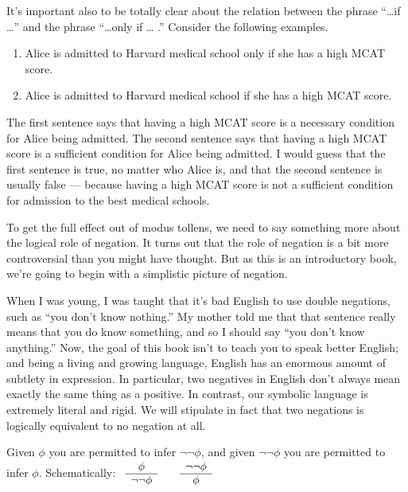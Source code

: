It's important also to be totally clear about the relation between the
phrase ``\dots if \dots'' and the phrase ``\dots only if \dots
.''  Consider the following examples.
\begin{enumerate}
  \item Alice is admitted to Harvard medical school only if she has a high
  MCAT score.
  \item Alice is admitted to Harvard medical school if she has a high
    MCAT score.
  \end{enumerate}
  The first sentence says that having a high MCAT score is a necessary
  condition for Alice being admitted.  The second sentence says that
  having a high MCAT score is a sufficient condition for Alice being
  admitted.  I would guess that the first sentence is true, no matter
  who Alice is, and that the second sentence is usually false ---
  because having a high MCAT score is not a sufficient condition for
  admission to the best medical schools.
 
To get the full effect out of modus tollens, we need to say something
more about the logical role of negation.  It turns out that the role
of negation is a bit more controversial than you might have thought.
But as this is an introductory book, we're going to begin with a
simplistic picture of negation.

When I was young, I was taught that it's bad English to use double
negations, such as ``you don't know nothing.''  My mother told me that
that sentence really means that you do know something, and so I should
say ``you don't know anything.''  Now, the goal of this book isn't to
teach you to speak better English; and being a living and growing
language, English has an enormous amount of subtlety in expression.
In particular, two negatives in English don't always mean exactly the
same thing as a positive.  In contrast, our symbolic language is
extremely literal and rigid.  We will stipulate in fact that two
negations is logically equivalent to no negation at all.

\bigskip 
\begin{tcolorbox}[enhanced,width=10cm,title=double negation (DN),attach boxed title to top
  left={yshift=-2mm,xshift=4mm},boxed title style={sharp corners}]
Given $\phi$ you are permitted to infer $\neg \neg \phi$, and given
$\neg \neg \phi$ you are permitted to infer $\phi$. \newline Schematically:
  $\begin{array}{c c c} \begin{array}{c} \phi \\ \hline \neg\neg
        \phi \end{array} & & \begin{array}{c} \neg \neg \phi \\ \hline
        \phi \end{array} \end{array} $
\end{tcolorbox}
\bigskip 

